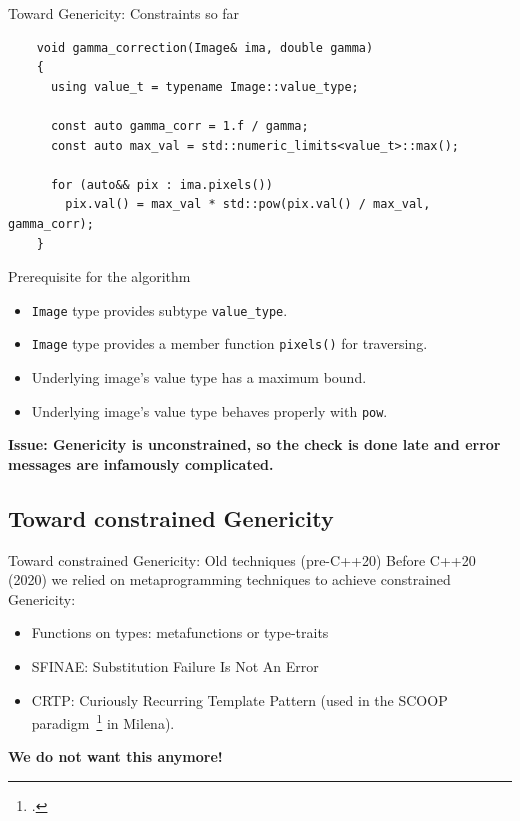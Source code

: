 \documentclass[12pt,aspectratio=169]{beamer}
\begin{document}
\begin{frame}[fragile]{Toward Genericity: Constraints so far}
  \begin{verbatim}
    void gamma_correction(Image& ima, double gamma)
    {
      using value_t = typename Image::value_type;

      const auto gamma_corr = 1.f / gamma;
      const auto max_val = std::numeric_limits<value_t>::max();
    
      for (auto&& pix : ima.pixels())
        pix.val() = max_val * std::pow(pix.val() / max_val, gamma_corr);
    }
  \end{verbatim}
  \begin{alertblock}{Prerequisite for the algorithm}
    \begin{itemize}
      \item \texttt{Image} type provides subtype \texttt{value\_type}.
      \item \texttt{Image} type provides a member function \texttt{pixels()} for traversing.
      \item Underlying image's value type has a maximum bound.
      \item Underlying image's value type behaves properly with \texttt{pow}.
    \end{itemize}
  \end{alertblock}
  \textbf{Issue: Genericity is unconstrained, so the check is done late and error messages are infamously complicated.}
\end{frame}


\subsection[Toward constrained Genericity]{Toward constrained Genericity}

\begin{frame}[fragile]{Toward constrained Genericity: Old techniques (pre-C++20)}
  Before C++20 (2020) we relied on metaprogramming techniques to achieve constrained Genericity:
  \vspace{-0.2cm}\begin{itemize}
    \item Functions on types: metafunctions or type-traits
    \item SFINAE: Substitution Failure Is Not An Error
    \item CRTP: Curiously Recurring Template Pattern (used in the SCOOP paradigm~\footcite{geraud.2008.mpool} in Milena).
  \end{itemize}
  \vspace{-0.3cm}
  \begin{center}\textbf{We do not want this anymore!}\end{center}
\end{frame}
\end{document}
